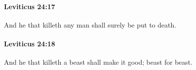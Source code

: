 		\paragraph{Leviticus 24:17} %
			\label{LEVITICUS-24-17}

			And he that killeth any man shall surely be put to death.


		\paragraph{Leviticus 24:18} %
			\label{LEVITICUS-24-18}

			And he that killeth a beast shall make it good; beast for beast.


